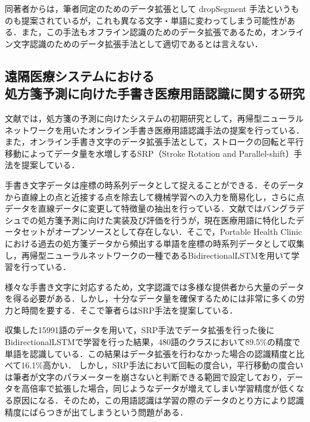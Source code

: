 同著者からは，筆者同定のためのデータ拡張として dropSegment 手法というものも提案されているが\cite{yang16:dropsegment}，これも異なる文字・単語に変わってしまう可能性がある．また，この手法もオフライン認識のためのデータ拡張であるため，オンライン文字認識のためのデータ拡張手法として適切であるとは言えない．

\subsection{遠隔医療システムにおける\\処方箋予測に向けた手書き医療用語認識に関する研究\cite{takahashi}}
文献\cite{takahashi}では，処方箋の予測に向けたシステムの初期研究として，再帰型ニューラルネットワークを用いたオンライン手書き医療用語認識手法の提案を行っている．また，オンライン手書き文字のデータ拡張手法として，ストロークの回転と平行移動によってデータ量を水増しするSRP（Stroke Rotation and Parallel-shift）手法を提案している．

手書き文字データは座標の時系列データとして捉えることができる．そのデータから直線上の点と近接する点を除去して機械学習への入力を簡易化し，さらに点データを直線データに変更して特徴量の抽出を行っている．文献\cite{takahashi}ではバングラデシュでの処方箋予測に向けた実装及び評価を行うが，現在医療用語に特化したデータセットがオープンソースとして存在しない．そこで，Portable Health Clinicにおける過去の処方箋データから頻出する単語を座標の時系列データとして収集し，再帰型ニューラルネットワークの一種であるBidirectionalLSTMを用いて学習を行っている．

様々な手書き文字に対応するため，文字認識では多様な提供者から大量のデータを得る必要がある．しかし，十分なデータ量を確保するためには非常に多くの労力と時間を要する．そこで筆者らはSRP手法を提案している．

収集した15991語のデータを用いて，SRP手法でデータ拡張を行った後にBidirectionalLSTMで学習を行った結果，480語のクラスにおいて89.5\%の精度で単語を認識している．この結果はデータ拡張を行わなかった場合の認識精度と比べて16.1\%高かい．
しかし，SRP手法において回転の度合い，平行移動の度合いは筆者が文字のパラメーターを崩さないと判断できる範囲で設定しており，データを高倍率で拡張した場合，同じようなデータが増えてしまい学習精度が低くなる原因になる．そのため，この用語認識は学習の際のデータのとり方により認識精度にばらつきが出てしまうという問題がある．
